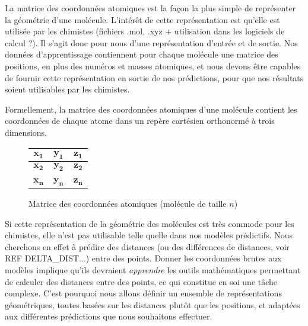 \par La matrice des coordonnées atomiques est la façon la plus simple de représenter la géométrie d'une molécule. L'intérêt de cette représentation est qu'elle est utilisée par les chimistes (fichiers .mol, .xyz + utilisation dans les logiciels de calcul ?). Il s'agit donc pour nous d'une représentation d'entrée et de sortie. Nos données d'apprentissage contiennent pour chaque molécule une matrice des positions, en plus des numéros et masses atomiques, et nous devons être capables de fournir cette représentation en sortie de nos prédictions, pour que nos résultats soient utilisables par les chimistes.\\

\par Formellement, la matrice des coordonnées atomiques d'une molécule contient les coordonnées de chaque atome dans un repère cartésien orthonormé à trois dimensions.

\begin{figure}[!h]
	\centering
	
	\begin{tabular}{|c|c|c|}
		\hline
		$\boldsymbol{x_1}$ & $\boldsymbol{y_1}$ & $\boldsymbol{z_1}$ \\ \hline	
		$\boldsymbol{x_2}$ & $\boldsymbol{y_2}$ & $\boldsymbol{z_2}$ \\ \hline	
		\textbf{\rot{... }} & \textbf{\rot{... }} & \textbf{\rot{... }}\\ \hline 	
		$\boldsymbol{x_n}$ & $\boldsymbol{y_n}$ & $\boldsymbol{z_n}$ \\ \hline	
	\end{tabular}

	\caption{Matrice des coordonnées atomiques (molécule de taille $n$)}
\end{figure}

\par Si cette représentation de la géométrie des molécules est très commode pour les chimistes, elle n'est pas utilisable telle quelle dans nos modèles prédictifs. Nous cherchons en effet à prédire des distances (ou des différences de distances, voir REF DELTA\_DIST...) entre des points. Donner les coordonnées  brutes aux modèles implique qu'ils devraient \emph{apprendre} les outils mathématiques permettant de calculer des distances entre des points, ce qui constitue en soi une tâche complexe. C'est pourquoi nous allons définir un ensemble de représentations géométriques, toutes basées sur les distances plutôt que les positions, et adaptées aux différentes prédictions que nous souhaitons effectuer.